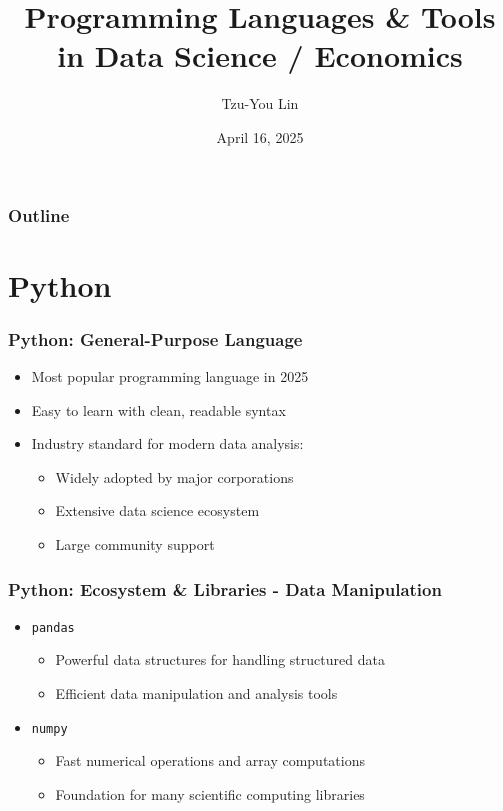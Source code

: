 \documentclass[10pt]{beamer}
\title{Programming Languages \& Tools in Data Science / Economics}
\author{Tzu-You Lin}
\date{April 16, 2025}
\begin{document}
\begin{frame}
    \titlepage
\end{frame}

\begin{frame}
    \frametitle{Outline}
    \tableofcontents
\end{frame}

\section{Python}

\begin{frame}
    \frametitle{Python: General-Purpose Language}
    \begin{itemize}
        \item Most popular programming language in 2025
        \item Easy to learn with clean, readable syntax
        \item Industry standard for modern data analysis:
            \begin{itemize}
                \item Widely adopted by major corporations
                \item Extensive data science ecosystem
                \item Large community support
            \end{itemize}
    \end{itemize}
\end{frame}

\begin{frame}
    \frametitle{Python: Ecosystem \& Libraries - Data Manipulation}
    \begin{itemize}
        \item \texttt{pandas}
            \begin{itemize}
                \item Powerful data structures for handling structured data
                \item Efficient data manipulation and analysis tools
            \end{itemize}
        \item \texttt{numpy}
            \begin{itemize}
                \item Fast numerical operations and array computations
                \item Foundation for many scientific computing libraries
            \end{itemize}
    \end{itemize}
\end{frame}
\end{document}
